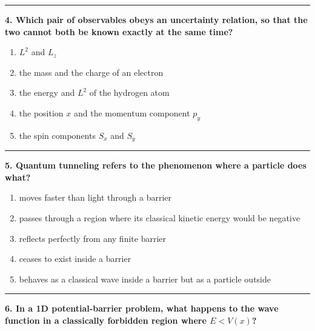 \documentclass[
  english,
  9pt,
]{extbook}
\providecommand{\tightlist}{%
  \setlength{\itemsep}{0pt}\setlength{\parskip}{0pt}}
\theoremstyle{definition}
\theoremstyle{definition}
\theoremstyle{definition}
\theoremstyle{definition}
\theoremstyle{remark}
\begin{document}
\begin{center}\rule{0.5\linewidth}{0.5pt}\end{center}

\textbf{4. Which pair of observables obeys an uncertainty relation, so that the two cannot both be known exactly at the same time?}

\begin{enumerate}
\def\labelenumi{\alph{enumi}.}
\tightlist
\item
  \(L^2\) and \(L_z\)\\
\item
  the mass and the charge of an electron\\
\item
  the energy and \(L^2\) of the hydrogen atom\\
\item
  the position \(x\) and the momentum component \(p_y\)\\
\item
  the spin components \(S_x\) and \(S_y\)
\end{enumerate}

\begin{center}\rule{0.5\linewidth}{0.5pt}\end{center}

\textbf{5. Quantum tunneling refers to the phenomenon where a particle does what?}

\begin{enumerate}
\def\labelenumi{\alph{enumi}.}
\tightlist
\item
  moves faster than light through a barrier\\
\item
  passes through a region where its classical kinetic energy would be negative\\
\item
  reflects perfectly from any finite barrier\\
\item
  ceases to exist inside a barrier\\
\item
  behaves as a classical wave inside a barrier but as a particle outside
\end{enumerate}

\begin{center}\rule{0.5\linewidth}{0.5pt}\end{center}

\textbf{6. In a 1D potential‑barrier problem, what happens to the wave function in a classically forbidden region where \(E < V(x)\)?}
\end{document}
